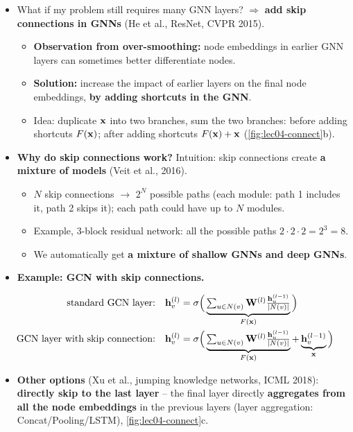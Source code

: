 \begin{itemize}
  \item What if my problem still requires many GNN layers? $\Rightarrow$
    \textbf{add skip connections in GNNs} (He et al., ResNet, CVPR 2015).
    \begin{itemize}
      \item \textbf{Observation from over-smoothing:} node embeddings in earlier
        GNN layers can sometimes better differentiate nodes.
      \item \textbf{Solution:} increase the impact of earlier layers on the final
        node embeddings, \textbf{by adding shortcuts in the GNN}.
      \item Idea: duplicate $\mathbf{x}$ into two branches, sum the two branches:
        before adding shortcuts $F(\mathbf{x})$; after adding shortcuts
        $F(\mathbf{x})+\mathbf{x}$ (\cref{fig:lec04-connect}b).
    \end{itemize}
  \item \textbf{Why do skip connections work?} Intuition: skip connections
    create \textbf{a mixture of models} (Veit et al., 2016).
    \begin{itemize}
      \item $N$ skip connections $\to$ $2^N$ possible paths (each module: path 1
        includes it, path 2 skips it); each path could have up to $N$ modules.
      \item Example, 3-block residual network: all the possible paths
        $2\cdot2\cdot2=2^3=8$.
      \item We automatically get \textbf{a mixture of shallow GNNs and deep
        GNNs}.
    \end{itemize}
  \item \textbf{Example: GCN with skip connections.}
\end{itemize}
\begin{align}
  \text{standard GCN layer:}\quad
    & \mathbf{h}_v^{(l)} = \sigma\Big(\underbrace{\textstyle\sum_{u\in N(v)}\mathbf{W}^{(l)}\frac{\mathbf{h}_u^{(l-1)}}{|N(v)|}}_{F(\mathbf{x})}\Big)
    \label{eq:lec04-gcn-std}\\
  \text{GCN layer with skip connection:}\quad
    & \mathbf{h}_v^{(l)} = \sigma\Big(\underbrace{\textstyle\sum_{u\in N(v)}\mathbf{W}^{(l)}\frac{\mathbf{h}_u^{(l-1)}}{|N(v)|}}_{F(\mathbf{x})}
      + \underbrace{\mathbf{h}_v^{(l-1)}}_{\mathbf{x}}\Big)
    \label{eq:lec04-gcn-skip}
\end{align}
\begin{itemize}
  \item \textbf{Other options} (Xu et al., jumping knowledge networks, ICML
    2018): \textbf{directly skip to the last layer} -- the final layer directly
    \textbf{aggregates from all the node embeddings} in the previous layers
    (layer aggregation: Concat/Pooling/LSTM), \cref{fig:lec04-connect}c.
\end{itemize}

